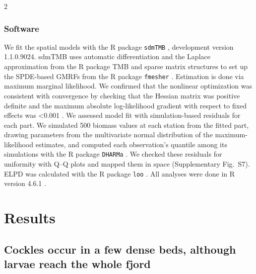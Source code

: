 \begin{spacing}{2}
\subsubsection{Software}
We fit the spatial models with the R package \texttt{sdmTMB} \citep{andersonSdmTMBPackageFast2025}, development version 1.1.0.9024. sdmTMB uses automatic differentiation and the Laplace approximation from the R package TMB \citep{kristensenTMBAutomaticDifferentiation2016} and sparse matrix structures to set up the SPDE-based GMRFs from the R package \texttt{fmesher} \citep{lindgrenFmesherTriangleMeshes2025}. Estimation is done via maximum marginal likelihood. We confirmed that the nonlinear optimization was consistent with convergence by checking that the Hessian matrix was positive definite and the maximum absolute log-likelihood gradient with respect to fixed effects was <0.001 \citep{andersonSdmTMBPackageFast2025}. We assessed model fit with simulation-based residuals for each part. We simulated 500 biomass values at each station from the fitted part, drawing parameters from the multivariate normal distribution of the maximum-likelihood estimates, and computed each observation's quantile among its simulations with the R package \texttt{DHARMa} \citep{hartigDHARMaResidualDiagnostics2022}. We checked these residuals for uniformity with Q–Q plots and mapped them in space (Supplementary Fig.~S7). ELPD was calculated with the R package \texttt{loo} \citep{vehtari2017practical}. All analyses were done in R version 4.6.1 \citep{rcore2024}.

\section{Results}

\subsection{Cockles occur in a few dense beds, although larvae reach the whole fjord}


\end{spacing}
